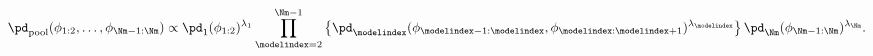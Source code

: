 \begin{equation}
  \pd_{\text{pool}} (\phi_{1:2}, \ldots, \phi_{\Nm - 1:\Nm}) \propto
  \pd_{1}(\phi_{1:2})^{\lambda_{1}} 
  \prod_{\modelindex = 2}^{\Nm - 1} \left\{
    \pd_{\modelindex}(\phi_{\modelindex - 1:\modelindex}, \phi_{\modelindex:\modelindex + 1})^{\lambda_{\modelindex}}
  \right\}
  \pd_{\Nm}(\phi_{\Nm - 1:\Nm})^{\lambda_{\Nm}}.
  \label{eqn:pooled-prior-overall-general}
\end{equation}